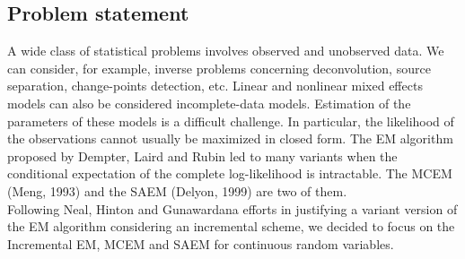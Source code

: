\documentclass[a0,portrait]{a0poster}
\begin{document}
\begin{multicols}{2}
\section{Problem statement}
\color{Navy} %
A wide class of statistical problems involves observed and unobserved data. We can consider, for example,
inverse problems concerning deconvolution, source separation, change-points detection, etc. Linear and nonlinear
mixed effects models can also be considered incomplete-data models. Estimation of the parameters of these
models is a difficult challenge. In particular, the likelihood of the observations cannot usually be maximized in
closed form. The EM algorithm proposed by Dempter, Laird and Rubin led to many variants when the conditional expectation of the complete log-likelihood is intractable. The MCEM (Meng, 1993) and the SAEM (Delyon, 1999) are two of them.\\
Following Neal, Hinton and Gunawardana efforts in justifying a variant version of the EM algorithm considering an incremental scheme, we decided to focus on the Incremental EM, MCEM and SAEM for continuous random variables.


\color{DarkSlateGray} %


\end{multicols}
\end{document}
